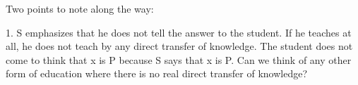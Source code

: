 \documentclass[10 pt]{article}
\begin{document}
\begin{description}
Two points to note along the way: 

1. S emphasizes that he does not tell the answer to the student. If he teaches at all, he does not teach by any direct transfer of knowledge. The student does not come to think that x is P because S says that x is P. Can we think of any other form of education where there is no real direct transfer of knowledge? 





\end{description}
\end{document}
